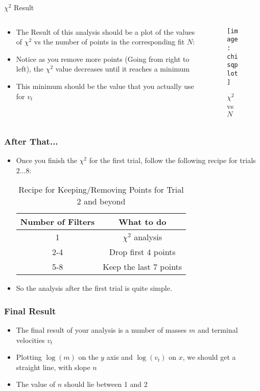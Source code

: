 \documentclass[aspectratio=169]{beamer}
\begin{document}
\begin{frame}{$\chi^2$ Result}
  \begin{columns}
    \begin{column}{0.5\textwidth}
      \begin{itemize}
      \item The Result of this analysis should be a plot of the values of $\chi^2$ vs the number of points in the corresponding fit $N$:
      \item Notice as you remove more points (Going from right to left), the $\chi^2$ value decreases until it reaches a minimum
      \item This minimum should be the value that you actually use for $v_t$
      \end{itemize}
    \end{column}
    \begin{column}{0.5\textwidth}
      \begin{figure}[H]
        \centering
        \texttt{[image: chisqplot]}
        \caption{$\chi^2$ vs $N$}
      \end{figure}
    \end{column}
  \end{columns}
\end{frame}

\begin{frame}
  \frametitle{After That...}
  \begin{itemize}
  \item Once you finish the $\chi^2$ for the first trial, follow the following recipe for trials $2\ldots8$:
    \begin{table}[H]
      \centering
      \begin{tabular}{|c|c|}
        \hline
        Number of Filters & What to do \\ \hline
        1 & $\chi^2$ analysis \\
        2-4 & Drop first 4 points \\
        5-8 & Keep the last 7 points \\ \hline
      \end{tabular}
      \caption{Recipe for Keeping/Removing Points for Trial 2 and beyond}
      \label{tab:table1}
    \end{table}
  \item So the analysis after the first trial is quite simple.
  \end{itemize}
\end{frame}

\begin{frame}
  \frametitle{Final Result}
  \begin{itemize}
  \item The final result of your analysis is a number of masses $m$ and terminal velocities $v_t$
  \item Plotting $\log(m)$ on the $y$ axis and $\log(v_t)$ on $x$, we should get a straight line, with slope $n$
  \item The value of $n$ should lie between 1 and 2
  \end{itemize}
\end{frame}
\end{document}
